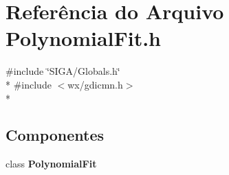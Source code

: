 \section{Referência do Arquivo Polynomial\+Fit.\+h}
\label{_polynomial_fit_8h}
{\ttfamily \#include \char`\"{}S\+I\+G\+A/\+Globals.\+h\char`\"{}}\\*
{\ttfamily \#include $<$wx/gdicmn.\+h$>$}\\*
\subsection*{Componentes}
\begin{DoxyCompactItemize}
\item 
class {\bf Polynomial\+Fit}
\end{DoxyCompactItemize}

